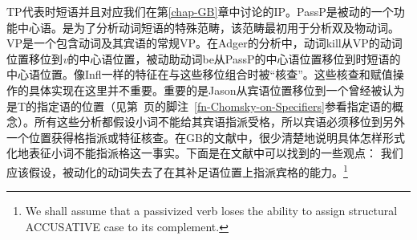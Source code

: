 TP代表时短语并且对应我们在第\ref{chap-GB}章中讨论的IP。PassP是被动的一个功能中心语。\vPc{}是为了分析动词短语的特殊范畴，该范畴最初用于分析双及物动词\citep{Larson88a}。VP是一个包含动词及其宾语的常规VP。在Adger的分析中，动词kill从VP的动词位置移位到\textit{v}的中心语位置，被动助动词be从PassP的中心语位置移位到时短语的中心语位置。像Infl一样的特征在与这些移位组合时被“核查”。这些核查和赋值操作的具体实现在这里并不重要。重要的是Jason从宾语位置移位到一个曾经被认为是T的指定语的位置（见第~\pageref{fn-Chomsky-on-Specifiers}页的脚注~\ref{fn-Chomsky-on-Specifiers}参看指定语的概念）。所有这些分析都假设小词不能给其宾语指派受格，所以宾语必须移位到另外一个位置获得格指派或特征核查。在GB的文献中，很少清楚地说明具体怎样形式化地表征小词不能指派格这一事实。下面是在文献中可以找到的一些观点：
\eal
\ex 我们应该假设，被动化的动词失去了在其补足语位置上指派宾格的能力。\footnote{
We shall assume that a passivized verb loses the ability to assign structural ACCUSATIVE case to
its complement.}\citep[]{Haegeman94a-u}

